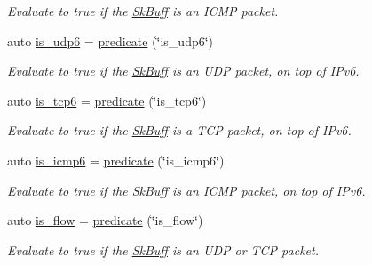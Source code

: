 \begin{DoxyCompactItemize}
\begin{DoxyCompactList}\small\item\em Evaluate to {\ttfamily true} if the \hyperlink{structpfq_1_1lang_1_1SkBuff}{Sk\+Buff} is an I\+C\+M\+P packet. \end{DoxyCompactList}\item 
auto \hyperlink{namespacepfq_1_1lang_1_1anonymous__namespace_02default_8hpp_03_a8f3f79760f7be2ce30db5025bff887a6}{is\+\_\+udp6} = \hyperlink{namespacepfq_1_1lang_a6c156f209614d0291b280153416dba97}{predicate} (\char`\"{}is\+\_\+udp6\char`\"{})
\begin{DoxyCompactList}\small\item\em Evaluate to {\ttfamily true} if the \hyperlink{structpfq_1_1lang_1_1SkBuff}{Sk\+Buff} is an U\+D\+P packet, on top of I\+Pv6. \end{DoxyCompactList}\item 
auto \hyperlink{namespacepfq_1_1lang_1_1anonymous__namespace_02default_8hpp_03_a56d9bafc51ca6775da4ec3b816b1c7bb}{is\+\_\+tcp6} = \hyperlink{namespacepfq_1_1lang_a6c156f209614d0291b280153416dba97}{predicate} (\char`\"{}is\+\_\+tcp6\char`\"{})
\begin{DoxyCompactList}\small\item\em Evaluate to {\ttfamily true} if the \hyperlink{structpfq_1_1lang_1_1SkBuff}{Sk\+Buff} is a T\+C\+P packet, on top of I\+Pv6. \end{DoxyCompactList}\item 
auto \hyperlink{namespacepfq_1_1lang_1_1anonymous__namespace_02default_8hpp_03_a01d6e9764945cc33a11f3ce6a9925549}{is\+\_\+icmp6} = \hyperlink{namespacepfq_1_1lang_a6c156f209614d0291b280153416dba97}{predicate} (\char`\"{}is\+\_\+icmp6\char`\"{})
\begin{DoxyCompactList}\small\item\em Evaluate to {\ttfamily true} if the \hyperlink{structpfq_1_1lang_1_1SkBuff}{Sk\+Buff} is an I\+C\+M\+P packet, on top of I\+Pv6. \end{DoxyCompactList}\item 
auto \hyperlink{namespacepfq_1_1lang_1_1anonymous__namespace_02default_8hpp_03_ae52890434121a999589d48bccae3c3e2}{is\+\_\+flow} = \hyperlink{namespacepfq_1_1lang_a6c156f209614d0291b280153416dba97}{predicate} (\char`\"{}is\+\_\+flow\char`\"{})
\begin{DoxyCompactList}\small\item\em Evaluate to {\ttfamily true} if the \hyperlink{structpfq_1_1lang_1_1SkBuff}{Sk\+Buff} is an U\+D\+P or T\+C\+P packet. \end{DoxyCompactList}\item 

\end{DoxyCompactItemize}
